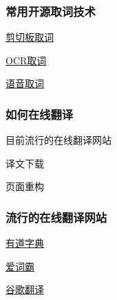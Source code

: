 \documentclass[10pt]{beamer}
\begin{document}
\begin{CJK*}{UTF8}{song}
\begin{frame}
  \frametitle{\Large{常用开源取词技术}}
\LARGE\begin{itemize}
 {\item \href{http://nullege.com/codes/show/src@p@y@python-xlib-HEAD@trunk@examples@record_demo.py/86/Xlib.display.Display.record_create_context}{剪切板取词}
  \item \href{https://code.google.com/p/tesseract-ocr/}{OCR取词}
  \item \href{http://www.athoughtabroad.com/2013/05/22/using-google-s-speech-recognition-web-service-with-python}{语音取词}}
\end{itemize}
\end{frame}

\begin{frame}
  \frametitle{\Large{如何在线翻译}}
\LARGE\begin{itemize}
 {\item 目前流行的在线翻译网站
  \item 译文下载
  \item 页面重构}
\end{itemize}
\end{frame}


\begin{frame}
  \frametitle{\Large{流行的在线翻译网站}}
\LARGE\begin{itemize}
 {\item \href{http://dict.youdao.com/search?q=}{有道字典}
  \item \href{http://www.iciba.com/}{爱词霸}
  \item \href{http://translate.google.cn/\#en/zh-CN/}{谷歌翻译}}
\end{itemize}
\end{frame}


\end{CJK*}
\end{document}
